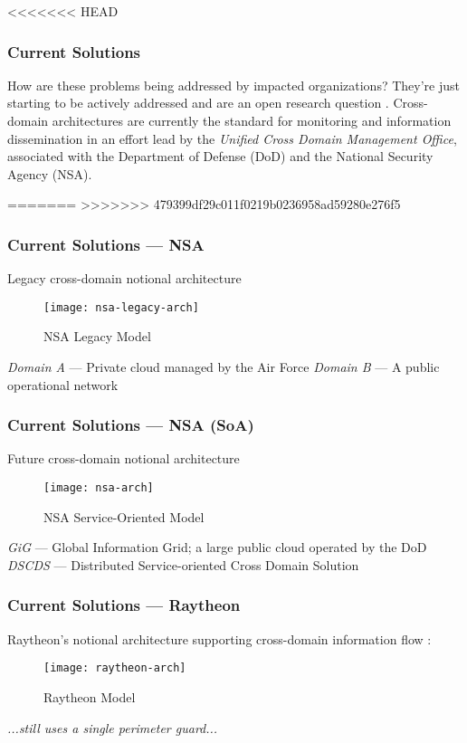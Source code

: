 <<<<<<< HEAD
\begin{frame}[t]
\frametitle{Current Solutions}
How are these problems being addressed by impacted organizations?
\newline
\newline
\pause
They're just starting to be actively addressed and are an open research question \cite{proposal:assured-info-sharing}.
\newline
\newline
Cross-domain architectures are currently the standard for monitoring and information dissemination in an effort lead by the \textit{Unified Cross Domain Management Office}, associated with the Department of Defense (DoD) and the National Security Agency (NSA).
\end{frame}
=======
>>>>>>> 479399df29c011f0219b0236958ad59280e276f5

\begin{frame}[t]
\frametitle{Current Solutions --- NSA}
Legacy cross-domain notional architecture \cite{proposal:nsa-arch}
\begin{figure}[!t]
\centering
\texttt{[image: nsa-legacy-arch]}
\caption{NSA Legacy Model}
\label{fig:model:conceptual-model}
\end{figure}

\textit{Domain A} --- Private cloud managed by the Air Force
\newline
\textit{Domain B} --- A public operational network
\end{frame}

\begin{frame}[t]
\frametitle{Current Solutions --- NSA (SoA)}
Future cross-domain notional architecture \cite{proposal:nsa-arch}
\begin{figure}[!t]
\centering
\texttt{[image: nsa-arch]}
\caption{NSA Service-Oriented Model}
\label{fig:model:conceptual-model}
\end{figure}

\textit{GiG} --- Global Information Grid; a large public cloud operated by the DoD
\newline
\textit{DSCDS} --- Distributed Service-oriented Cross Domain Solution
\end{frame}

\begin{frame}[t]
\frametitle{Current Solutions --- Raytheon}
Raytheon's notional architecture supporting cross-domain information flow \cite{proposal:raytheon-arch}:
\begin{figure}[!t]
\centering
\texttt{[image: raytheon-arch]}
\caption{Raytheon Model}
\label{fig:model:conceptual-model}
\end{figure}

\textit{...still uses a single perimeter guard...}
\end{frame}

